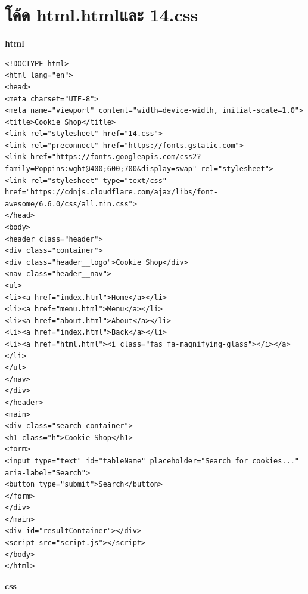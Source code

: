 \documentclass{report}
\begin{document}
\section{โค้ด html.htmlและ 14.css}
\textbf{html}
\begin{verbatim}
<!DOCTYPE html>
<html lang="en">
<head>
<meta charset="UTF-8">
<meta name="viewport" content="width=device-width, initial-scale=1.0">
<title>Cookie Shop</title>
<link rel="stylesheet" href="14.css">
<link rel="preconnect" href="https://fonts.gstatic.com">
<link href="https://fonts.googleapis.com/css2?family=Poppins:wght@400;600;700&display=swap" rel="stylesheet">
<link rel="stylesheet" type="text/css" href="https://cdnjs.cloudflare.com/ajax/libs/font-awesome/6.6.0/css/all.min.css">
</head>
<body>
<header class="header">
<div class="container">
<div class="header__logo">Cookie Shop</div>
<nav class="header__nav">
<ul>
<li><a href="index.html">Home</a></li>
<li><a href="menu.html">Menu</a></li>
<li><a href="about.html">About</a></li>
<li><a href="index.html">Back</a></li>
<li><a href="html.html"><i class="fas fa-magnifying-glass"></i></a></li>
</ul>
</nav>
</div>
</header>
<main>
<div class="search-container">
<h1 class="h">Cookie Shop</h1>
<form>
<input type="text" id="tableName" placeholder="Search for cookies..." aria-label="Search">
<button type="submit">Search</button>
</form>
</div>
</main>
<div id="resultContainer"></div>
<script src="script.js"></script>
</body>
</html>
\end{verbatim}
\textbf{css}
\end{document}
